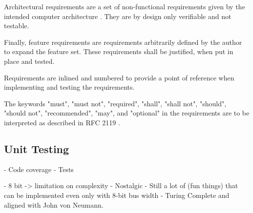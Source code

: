 Architectural requirements are a set of non-functional requirements given by the intended computer architecture \cite{vonneuman1945a}. They are by design only verifiable and not testable. 

Finally, feature requirements are requirements arbitrarily defined by the author to expand the feature set. These requirements shall be justified, when put in place and tested.

Requirements are inlined and numbered to provide a point of reference when implementing and testing the requirements. 

\newtheorem{turing-requirement}{Turing Req.}[subsection]
\newtheorem{arch-requirement}{Arch. Req.}[subsection]
\newtheorem{feat-requirement}{Feat. Req.}[subsection]

The keywords "must", "must not", "required", "shall", "shall not", "should", "should not", "recommended",  "may", and "optional" in the requirements are to be interpreted as described in RFC 2119 \cite{rfc2119}.

\subsection{Unit Testing}
- Code coverage
- Tests



- 8 bit -> limitation on complexity
- Nostalgic
- Still a lot of (fun things) that can be implemented even only with 8-bit bus width
- Turing Complete and aligned with John von Neumann.



